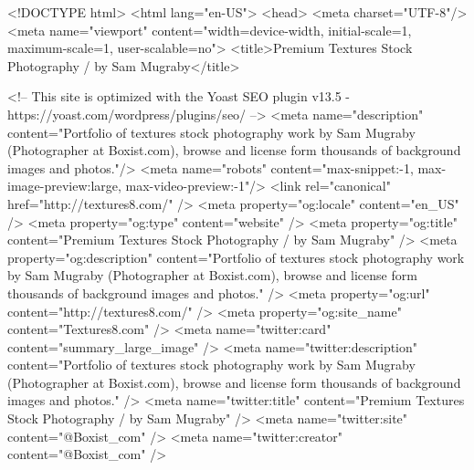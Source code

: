 <!DOCTYPE html>
<html lang="en-US">
<head>
	<meta charset="UTF-8"/>
	<meta name="viewport" content="width=device-width, initial-scale=1, maximum-scale=1, user-scalable=no">
	<title>Premium Textures Stock Photography / by Sam Mugraby</title>

<!-- This site is optimized with the Yoast SEO plugin v13.5 - https://yoast.com/wordpress/plugins/seo/ -->
<meta name="description" content="Portfolio of textures stock photography work by Sam Mugraby (Photographer at Boxist.com), browse and license form thousands of background images and photos."/>
<meta name="robots" content="max-snippet:-1, max-image-preview:large, max-video-preview:-1"/>
<link rel="canonical" href="http://textures8.com/" />
<meta property="og:locale" content="en_US" />
<meta property="og:type" content="website" />
<meta property="og:title" content="Premium Textures Stock Photography / by Sam Mugraby" />
<meta property="og:description" content="Portfolio of textures stock photography work by Sam Mugraby (Photographer at Boxist.com), browse and license form thousands of background images and photos." />
<meta property="og:url" content="http://textures8.com/" />
<meta property="og:site_name" content="Textures8.com" />
<meta name="twitter:card" content="summary_large_image" />
<meta name="twitter:description" content="Portfolio of textures stock photography work by Sam Mugraby (Photographer at Boxist.com), browse and license form thousands of background images and photos." />
<meta name="twitter:title" content="Premium Textures Stock Photography / by Sam Mugraby" />
<meta name="twitter:site" content="@Boxist_com" />
<meta name="twitter:creator" content="@Boxist_com" />
